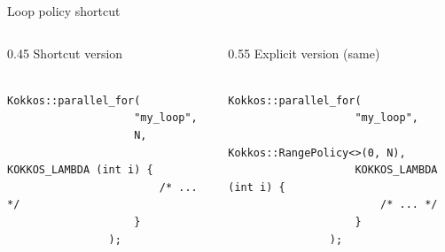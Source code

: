 \documentclass[
    aspectratio=169,
]{beamer}
\begin{document}
\begin{frame}[fragile]{Loop policy shortcut}
    \begin{columns}
        \begin{column}{0.45\linewidth}
            Shortcut version\strut

            \begin{verbatim}
                Kokkos::parallel_for(
                    "my_loop",
                    N,
                    KOKKOS_LAMBDA (int i) {
                        /* ... */
                    }
                );
            \end{verbatim}
        \end{column}
        \pause
        \begin{column}{0.55\linewidth}
            Explicit version (same)\strut

            \begin{verbatim}
                Kokkos::parallel_for(
                    "my_loop",
                    Kokkos::RangePolicy<>(0, N),
                    KOKKOS_LAMBDA (int i) {
                        /* ... */
                    }
                );
            \end{verbatim}
        \end{column}
    \end{columns}
\end{frame}
\end{document}
